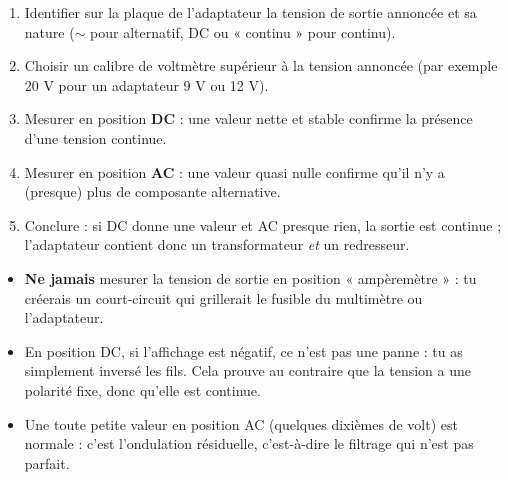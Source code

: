 \documentclass[11pt]{article}
\begin{document}
\begin{methode}
\begin{enumerate}
\item Identifier sur la plaque de l'adaptateur la tension de sortie annoncée et sa nature ($\sim$ pour alternatif, DC ou « continu » pour continu).
\item Choisir un calibre de voltmètre supérieur à la tension annoncée (par exemple 20 V pour un adaptateur 9 V ou 12 V).
\item Mesurer en position \textbf{DC} : une valeur nette et stable confirme la présence d'une tension continue.
\item Mesurer en position \textbf{AC} : une valeur quasi nulle confirme qu'il n'y a (presque) plus de composante alternative.
\item Conclure : si DC donne une valeur et AC presque rien, la sortie est continue ; l'adaptateur contient donc un transformateur \emph{et} un redresseur.
\end{enumerate}
\end{methode}

\begin{attention}
\begin{itemize}
\item \textbf{Ne jamais} mesurer la tension de sortie en position « ampèremètre » : tu créerais un court-circuit qui grillerait le fusible du multimètre ou l'adaptateur.
\item En position DC, si l'affichage est négatif, ce n'est pas une panne : tu as simplement inversé les fils. Cela prouve au contraire que la tension a une polarité fixe, donc qu'elle est continue.
\item Une toute petite valeur en position AC (quelques dixièmes de volt) est normale : c'est l'ondulation résiduelle, c'est-à-dire le filtrage qui n'est pas parfait.
\end{itemize}
\end{attention}
\end{document}
